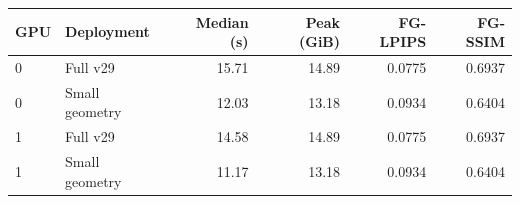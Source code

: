 \begin{tabular}{llrrrr}
\toprule
GPU & Deployment & Median (s) & Peak (GiB) & FG-LPIPS & FG-SSIM \\
\midrule
0 & Full v29 & 15.71 & 14.89 & 0.0775 & 0.6937 \\
0 & Small geometry & 12.03 & 13.18 & 0.0934 & 0.6404 \\
1 & Full v29 & 14.58 & 14.89 & 0.0775 & 0.6937 \\
1 & Small geometry & 11.17 & 13.18 & 0.0934 & 0.6404 \\
\bottomrule
\end{tabular}
